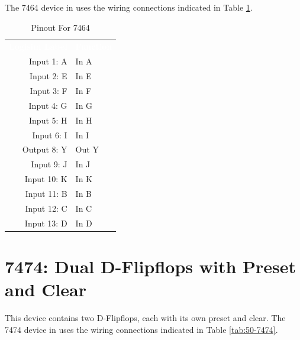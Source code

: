 The 7464 device in \LE uses the wiring connections indicated in Table \ref{tab:50-7464}.

\begin{table}[H]
	\sffamily
	\newcommand{\head}[1]{\textcolor{white}{\textbf{#1}}}		
	\begin{center}
		\begin{tabular}{rl} 
			\rowcolor{black!75}
			\head{Logisim Label} & \head{Function} \\
			Input 1: A   & In A  \\
			Input 2: E   & In E  \\
			Input 3: F   & In F  \\
			Input 4: G   & In G  \\
			Input 5: H   & In H  \\
			Input 6: I   & In I  \\
			Output 8: Y  & Out Y \\
			Input 9: J   & In J  \\
			Input 10: K  & In K  \\
			Input 11: B  & In B  \\
			Input 12: C  & In C  \\
			Input 13: D  & In D  \\
		\end{tabular}
	\end{center}
	\caption{Pinout For 7464}
	\label{tab:50-7464}
\end{table}

\section{7474: Dual D-Flipflops with Preset and Clear}

This device contains two D-Flipflops, each with its own preset and clear. The 7474 device in \LE uses the wiring connections indicated in Table \ref{tab:50-7474}.

